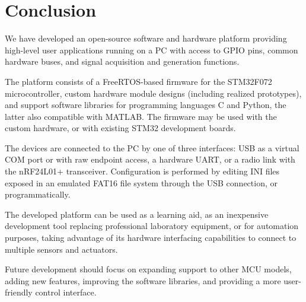 \chapter{Conclusion}

We have developed an open-source software and hardware platform providing high-level user applications running on a \gls{PC} with access to \gls{GPIO} pins, common hardware buses, and signal acquisition and generation functions.

The platform consists of a FreeRTOS-based firmware for the STM32F072 microcontroller, custom hardware module designs (including realized prototypes), and support software libraries for programming languages C and Python, the latter also compatible with MATLAB. The firmware may be used with the custom hardware, or with existing STM32 development boards.

The devices are connected to the \gls{PC} by one of three interfaces: \gls{USB} as a virtual COM port or with raw endpoint access, a hardware \gls{UART}, or a radio link with the nRF24L01+ transceiver. Configuration is performed by editing INI files exposed in an emulated FAT16 file system through the \gls{USB} connection, or programmatically.

The developed platform can be used as a learning aid, as an inexpensive development tool replacing professional laboratory equipment, or for automation purposes, taking advantage of its hardware interfacing capabilities to connect to multiple sensors and actuators.

Future development should focus on expanding support to other \gls{MCU} models, adding new features, improving the software libraries, and providing a more user-friendly control interface.
